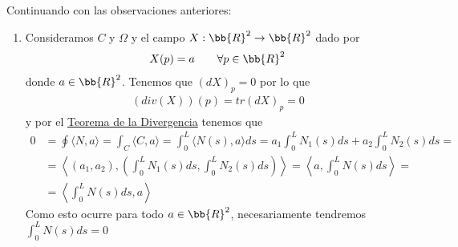 \begin{observacion}
    Continuando con las observaciones anteriores:
    \begin{enumerate}[start=4]
        \item Consideramos $C$ y $\Omega$ y el campo $X:\bb{R}^2 \to \bb{R}^2$ dado por 
        \begin{gather*}
            X(p)=a \qquad \forall p \in \bb{R}^2
        \end{gather*}
        donde $a\in \bb{R}^2$. Tenemos que $(dX)_p=0$ por lo que 
        \begin{gather*}
            (div(X))(p) = tr(dX)_p = 0
        \end{gather*}
        y por el \hyperref[teo:divergencia]{Teorema de la Divergencia} tenemos que 
        \begin{align*}
            0 &= \oint \langle N, a \rangle = \int_C \langle C, a \rangle = \int_0^L \langle N(s), a \rangle ds
            = a_1 \int_0^L N_1(s) ds + a_2\int_0^L N_2(s)ds =\\
            &= \left\langle (a_1, a_2), \left(  \int_0^L N_1(s) ds,  \int_0^L N_2(s) ds \right) \right\rangle = \left\langle a,  \int_0^L N(s) ds \right\rangle =\\
            &= \left\langle \int_0^L N(s) ds, a \right\rangle
        \end{align*}
        Como esto ocurre para todo $a\in \bb{R}^2$, necesariamente tendremos $\int_0^L N(s) ds = 0$


\end{enumerate}
\end{observacion}
